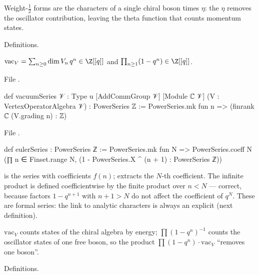 \begin{physics}
Weight-$\frac12$ forms are the characters of a single chiral boson times $\eta$: the $\eta$ removes the
oscillator contribution, leaving the theta function that counts momentum states.
\end{physics}

\begin{status}
Definitions.
\end{status}

\begin{definition}\label{l22:def:series}
$\mathrm{vac}_V=\sum_{n\ge0}\dim V_n\, q^n\in\Z[[q]]$ and $\prod_{n\ge1}(1-q^n)\in\Z[[q]]$.
\end{definition}
\noindent File .
\begin{leancode}
def vacuumSeries {𝒱 : Type u} [AddCommGroup 𝒱] [Module ℂ 𝒱] (V : VertexOperatorAlgebra 𝒱) :
    PowerSeries ℤ :=
  PowerSeries.mk fun n => (finrank ℂ (V.grading n) : ℤ)
\end{leancode}
\noindent File .
\begin{leancode}
def eulerSeries : PowerSeries ℤ :=
  PowerSeries.mk fun N =>
    PowerSeries.coeff N (∏ n ∈ Finset.range N, (1 - PowerSeries.X ^ (n + 1) : PowerSeries ℤ))
\end{leancode}

\begin{dictionary}
 is the series with coefficients $f(n)$;  extracts the $N$-th
coefficient. The infinite product is defined coefficientwise by the finite product over $n<N$ --- correct,
because factors $1-q^{n+1}$ with $n+1>N$ do not affect the coefficient of $q^N$. These are formal series: the
link to analytic characters is always an explicit  (next definition).
\end{dictionary}

\begin{physics}
$\mathrm{vac}_V$ counts states of the chiral algebra by energy; $\prod(1-q^n)^{-1}$ counts the oscillator
states of one free boson, so the product $\prod(1-q^n)\cdot\mathrm{vac}_V$ ``removes one boson''.
\end{physics}

\begin{status}
Definitions.
\end{status}

